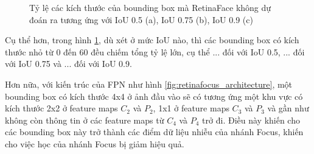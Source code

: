 {    \begin{figure}[H]
        \centering
        \caption{Tỷ lệ các kích thước của bounding box mà RetinaFace không dự đoán ra tương ứng với IoU 0.5 (a), IoU 0.75 (b), IoU 0.9 (c)}
        \label{fig:retinafocus_iou_lower}
    \end{figure}

    \noindent
    Cụ thể hơn, trong hình \ref{fig:retinafocus_iou_lower}, dù xét ở mức IoU nào, thì các bounding box có kích thước nhỏ từ 0 đến 60 đều chiếm tổng tỷ lệ lớn, cụ thể ... đối với IoU 0.5, ... đối với IoU 0.75 và ... đối với IoU 0.9.

    \noindent
    Hơn nữa, với kiến trúc của FPN như hình \ref{fig:retinafocus_architecture}, một bounding box có kích thước 4x4 ở ảnh đầu vào sẽ có tương ứng một khu vực có kích thước 2x2 ở feature maps ${C}_{2}$ và ${P}_{2}$, 1x1 ở feature maps ${C}_{3}$ và ${P}_{3}$ và gần như không còn thông tin ở các feature maps từ ${C}_{4}$ và ${P}_{4}$ trở đi.
    Điều này khiến cho các bounding box này trở thành các điểm dữ liệu nhiễu của nhánh Focus, khiến cho việc học của nhánh Focus bị giảm hiệu quả.

}
